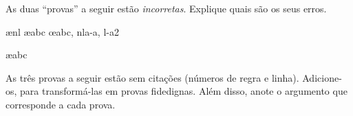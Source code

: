 \problempart
As duas ``provas'' a seguir estão  \emph{incorretas}. Explique quais são os seus erros.
\begin{fitchproof}
\open
{}
\ae{nl}
	\ae{abc}
\close
\open
\close
{}\oe{abc, nla-a, l-a2}
\end{fitchproof}

\begin{fitchproof}
\ae{abc}
\end{fitchproof}

\problempart
As três provas a seguir estão sem citações (números de regra e linha). Adicione-os, para transformá-las  em provas fidedignas.  Além disso, anote o argumento que corresponde a cada prova.
\begin{multicols}{2}
\begin{fitchproof}
\end{fitchproof}

\begin{fitchproof}
\open
\close
{}%
\end{fitchproof}

\begin{fitchproof}
\open
\close
\open
\close
{}%
\end{fitchproof}
\end{multicols}

